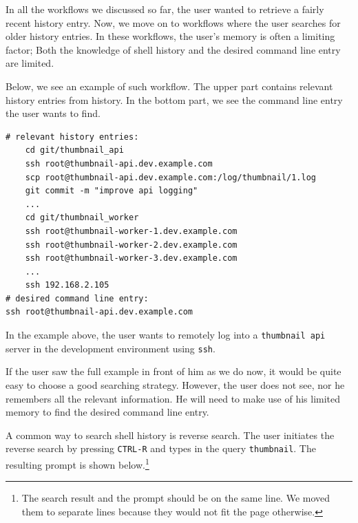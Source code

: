 In all the workflows we discussed so far, the user wanted to retrieve a fairly recent history entry. Now, we move on to workflows where the user searches for older history entries. In these workflows, the user's memory is often a limiting factor; Both the knowledge of shell history and the desired command line entry are limited.

Below, we see an example of such workflow. The upper part contains relevant history entries from history. In the bottom part, we see the command line entry the user wants to find. 



\begin{verbatim}
# relevant history entries:
    cd git/thumbnail_api
    ssh root@thumbnail-api.dev.example.com
    scp root@thumbnail-api.dev.example.com:/log/thumbnail/1.log
    git commit -m "improve api logging"
    ...
    cd git/thumbnail_worker
    ssh root@thumbnail-worker-1.dev.example.com
    ssh root@thumbnail-worker-2.dev.example.com
    ssh root@thumbnail-worker-3.dev.example.com
    ...
    ssh 192.168.2.105
# desired command line entry:
ssh root@thumbnail-api.dev.example.com
\end{verbatim}

In the example above, the user wants to remotely log into a \verb|thumbnail api| server in the development environment using \verb|ssh|. 

If the user saw the full example in front of him as we do now, it would be quite easy to choose a good searching strategy. However, the user does not see, nor he remembers all the relevant information. He will need to make use of his limited memory to find the desired command line entry. 

A common way to search shell history is reverse search. The user initiates the reverse search by pressing \verb|CTRL-R| and types in the query \verb|thumbnail|. The resulting prompt is shown below.\footnote{The search result and the prompt should be on the same line. We moved them to separate lines because they would not fit the page otherwise.}

